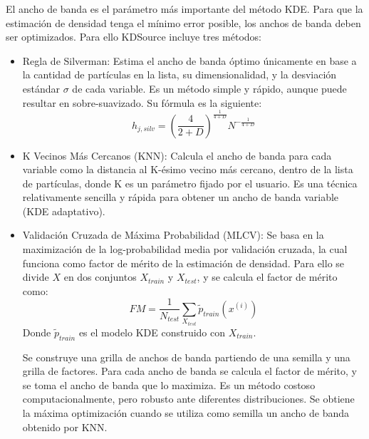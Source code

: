 El ancho de banda es el parámetro más importante del método KDE. Para que la estimación de densidad tenga el mínimo error posible, los anchos de banda deben ser optimizados. Para ello KDSource incluye tres métodos:
\begin{itemize}
    \item Regla de Silverman: Estima el ancho de banda óptimo únicamente en base a la cantidad de partículas en la lista, su dimensionalidad, y la desviación estándar $\sigma$ de cada variable. Es un método simple y rápido, aunque puede resultar en sobre-suavizado. Su fórmula es la siguiente:
    \begin{equation}
        h_{j,silv} = \left(\frac{4}{2+D}\right)^{\frac{1}{4+D}} N^{-\frac{1}{4+D}}
    \end{equation}  
    \item K Vecinos Más Cercanos (KNN): Calcula el ancho de banda para cada variable como la distancia al K-ésimo vecino más cercano, dentro de la lista de partículas, donde K es un parámetro fijado por el usuario. Es una técnica relativamente sencilla y rápida para obtener un ancho de banda variable (KDE adaptativo). 
    \item Validación Cruzada de Máxima Probabilidad (MLCV): Se basa en la maximización de la log-probabilidad media por validación cruzada, la cual funciona como factor de mérito de la estimación de densidad. Para ello se divide $X$ en dos conjuntos $X_{train}$ y $X_{test}$, y se calcula el factor de mérito como:
    \begin{equation}
        FM = \frac{1}{N_{test}} \sum_{X_{test}} \tilde{p}_{train}(x^{(i)}) 
    \end{equation}
    Donde $\tilde{p}_{train}$ es el modelo KDE construido con $X_{train}$.

    Se construye una grilla de anchos de banda partiendo de una semilla y una grilla de factores. Para cada ancho de banda se calcula el factor de mérito, y se toma el ancho de banda que lo maximiza. Es un método costoso computacionalmente, pero robusto ante diferentes distribuciones. Se obtiene la máxima optimización cuando se utiliza como semilla un ancho de banda obtenido por KNN.
\end{itemize}

